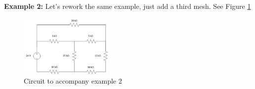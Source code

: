 \documentclass{handout}
\begin{document}
\newpage
\clearpage
\pagebreak

\textbf{Example 2:} Let's rework the same example, just add a third mesh.  See Figure \ref{fig: MeshAnalysisEx2}

\begin{figure} [h t b]
\centering
\includegraphics[width=0.4\textwidth]{MeshAnalysisEx2.jpg}
\caption{Circuit to accompany example 2}
\label{fig: MeshAnalysisEx2}
\end{figure}
\end{document}
